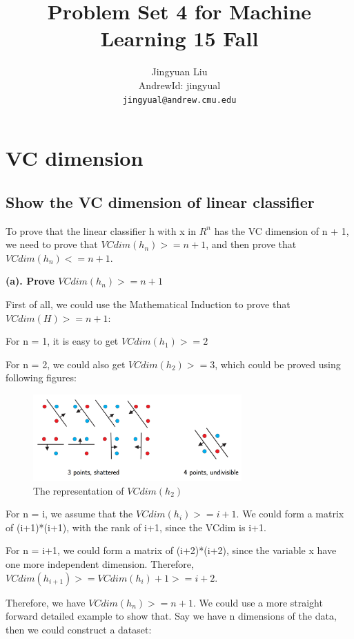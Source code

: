 \documentclass{article} %
\title{Problem Set 4 for Machine Learning 15 Fall}
\author{
Jingyuan Liu\\
AndrewId: jingyual\\
\texttt{jingyual@andrew.cmu.edu} \\
}
\begin{document}
\maketitle



\section{VC dimension}


\subsection{Show the VC dimension of linear classifier}
To prove that the linear classifier h with x in $ R^n $ has the VC dimension of
n + 1, we need to prove that $VCdim(h_n) >= n + 1$, and then prove that
$VCdim(h_n) <= n + 1$.

\textbf{(a). Prove $VCdim(h_n) >= n+1$}

First of all, we could use the Mathematical Induction to prove that $VCdim(H) >=
n+1$:

For n = 1, it is easy to get $VCdim(h_1) >= 2$

For n = 2, we could also get $VCdim(h_2) >= 3$, which could be proved using following figures:

\begin{figure}[!htbp]
\begin{center}
\includegraphics[width=80mm]{pic/q11.png}
\end{center}
\caption{The representation of $VCdim(h_2)$}
\end{figure}

For n = i, we assume that the $VCdim(h_i) >= i+1$. We could form a matrix of
(i+1)*(i+1),
with the rank of i+1, since the VCdim is i+1.

For n = i+1, we could form a matrix of (i+2)*(i+2), since the variable
x have one more independent dimension. Therefore, $VCdim(h_{i+1}) >= VCdim(h_i) + 1
>= i+2$.

Therefore, we have $VCdim(h_n) >= n+1$. We could use a more straight forward
detailed example to show that. Say we have n dimensions of the data, then we
could construct a dataset:
\end{document}
